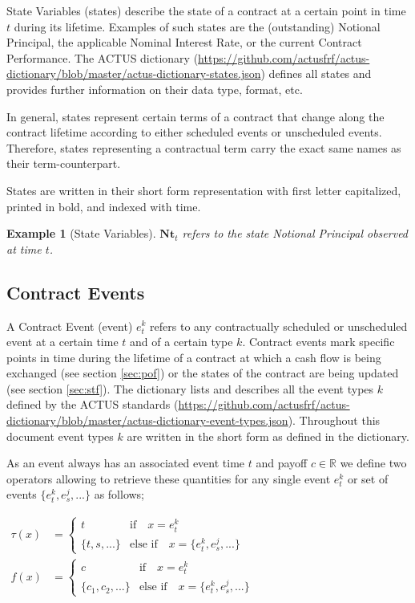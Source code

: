 \documentclass[9pt,oneside]{amsart}
\newtheorem{example}{Example}
\newcommand{\Real}{\mathbb{R}}
\newcommand{\svar}[2]{\textbf{#1}_{#2}}
\newcommand{\tev}[1]{\tau(#1)}
\newcommand{\fev}[1]{f(#1)}
\begin{document}
\begin{multicols}{2}
State Variables (states) describe the state of a contract at a certain point in time $t$ during its lifetime. Examples of such states are the (outstanding) Notional Principal, the applicable Nominal Interest Rate, or the current Contract Performance. The ACTUS dictionary (\url{https://github.com/actusfrf/actus-dictionary/blob/master/actus-dictionary-states.json}) defines all states and provides further information on their data type, format, etc.

In general, states represent certain terms of a contract that change along the contract lifetime according to either scheduled events or unscheduled events. Therefore, states representing a contractual term carry the exact same names as their term-counterpart.

States are written in their short form representation with first letter capitalized, printed in bold, and indexed with time.

\begin{example}[State Variables]
$\svar{Nt}{t}$ refers to the state \textit{Notional Principal} observed at time $t$.
\end{example}


\subsection{Contract Events}\label{sec:events}

A Contract Event (event) $e_t^k$ refers to any contractually scheduled or unscheduled event at a certain time $t$ and of a certain type $k$. Contract events mark specific points in time during the lifetime of a contract at which a cash flow is being exchanged (see section \ref{sec:pof}) or the states of the contract are being updated (see section \ref{sec:stf}). The dictionary lists and describes all the event types $k$ defined by the ACTUS standards (\url{https://github.com/actusfrf/actus-dictionary/blob/master/actus-dictionary-event-types.json}). Throughout this document event types $k$ are written in the short form as defined in the dictionary.

As an event always has an associated event time $t$ and payoff $c\in\Real$ we define two operators allowing to retrieve these quantities for any single event $e_t^k$ or set of events $\{e_t^k,e_s^j, ...\}$ as follows;

{$\begin{aligned}
	\tev{x} &= \begin{cases} t & \text{if}\quad x=e_t^k \\
				\{t,s,...\} & \text{else if}\quad x=\{e_t^k,e_s^j,...\} \end{cases} \\
	\fev{x} &= \begin{cases} c & \text{if}\quad x=e_t^k \\
				\{c_1, c_2, ...\} & \text{else if}\quad x=\{e_t^k,e_s^j,...\} \end{cases}
\end{aligned}$}


\end{multicols}
\end{document}
